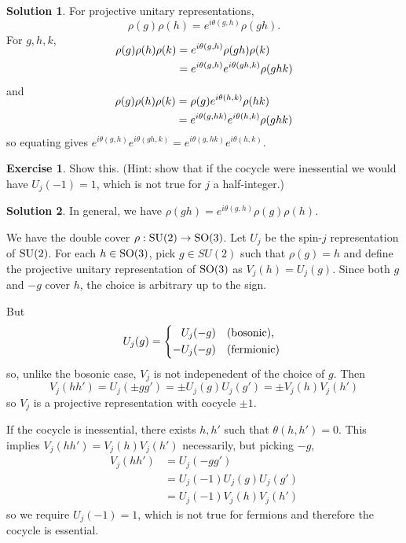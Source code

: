 \documentclass[11pt, a4paper]{report}
\theoremstyle{definition}
\newtheorem{ex}{Exercise}[part]
\newtheorem{sol}{Solution}[part]
\newcommand*{\SO}{\ensuremath\text{SO}}
\newcommand*{\SU}{\ensuremath\text{SU}}
\begin{document}
\begin{sol}

For projective unitary representations,
\[
    \rho(g) \rho(h) = e^{i\theta(g, h)} \rho(gh).
\]
For $g, h, k$,
\begin{align*}
    \SwapAboveDisplaySkip
    \rho(g) \rho(h) \rho(k) &= e^{i\theta(g, h)} \rho(gh) \rho(k) \\
                            &= e^{i\theta(g, h)} e^{i\theta(gh, k)} \rho(ghk)
\end{align*}
and
\begin{align*}
    \SwapAboveDisplaySkip
    \rho(g) \rho(h) \rho(k) &= \rho(g) e^{i\theta(h, k)} \rho(hk) \\
                            &= e^{i\theta(g, hk)} e^{i\theta(h, k)} \rho(ghk)
\end{align*}
so equating gives $e^{i\theta(g, h)} e^{i\theta(gh, k)} = e^{i\theta(g, hk)} e^{i\theta(h, k)}$.

\end{sol}

\begin{ex}

Show this.
(Hint: show that if the cocycle were inessential we would have $U_j(-1) = 1$, which is not true for $j$ a half-integer.)

\end{ex}

\begin{sol}

In general, we have $\rho(gh) = e^{i\theta(g, h)} \rho(g) \rho(h)$.

We have the double cover $\rho: \SU(2) \to \SO(3)$.
Let $U_j$ be the spin-$j$ representation of $\SU(2)$.
For each $h \in \SO(3)$, pick $g \in SU(2)$ such that $\rho(g) = h$ and define the projective unitary representation of $\SO(3)$ as $V_j(h) = U_j(g)$.
Since both $g$ and $-g$ cover $h$, the choice is arbitrary up to the sign.

But
\[
    U_j(g) = \begin{dcases*}
                \phantom{-} U_j(-g) & \text{(bosonic)}, \\
                -U_j(-g)            & \text{(fermionic)}
             \end{dcases*}
\]
so, unlike the bosonic case, $V_j$ is not indepenedent of the choice of $g$.
Then
\[
    V_j(hh') = U_j(\pm gg') = \pm U_j(g) U_j(g') = \pm V_j(h) V_j(h')
\]
so $V_j$ is a projective representation with cocycle $\pm1$.

If the cocycle is inessential, there exists $h, h'$ such that $\theta(h, h') = 0$.
This implies $V_j(hh') = V_j(h) V_j(h')$ necessarily, but picking $-g$,
\begin{align*}
    V_j(hh') &= U_j(-gg') \\
             &= U_j(-1) U_j(g) U_j(g') \\
             &= U_j(-1) V_j(h) V_j(h')
\end{align*}
so we require $U_j(-1) = 1$, which is not true for fermions and therefore the cocycle is essential.

\end{sol}
\end{document}
